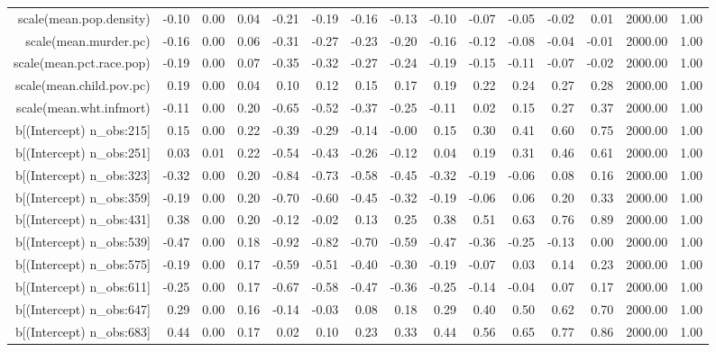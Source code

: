 \begin{table}[ht]
\begin{tabular}{rrrrrrrrrrrrrrr}
  scale(mean.pop.density) & -0.10 & 0.00 & 0.04 & -0.21 & -0.19 & -0.16 & -0.13 & -0.10 & -0.07 & -0.05 & -0.02 & 0.01 & 2000.00 & 1.00 \\ 
  scale(mean.murder.pc) & -0.16 & 0.00 & 0.06 & -0.31 & -0.27 & -0.23 & -0.20 & -0.16 & -0.12 & -0.08 & -0.04 & -0.01 & 2000.00 & 1.00 \\ 
  scale(mean.pct.race.pop) & -0.19 & 0.00 & 0.07 & -0.35 & -0.32 & -0.27 & -0.24 & -0.19 & -0.15 & -0.11 & -0.07 & -0.02 & 2000.00 & 1.00 \\ 
  scale(mean.child.pov.pc) & 0.19 & 0.00 & 0.04 & 0.10 & 0.12 & 0.15 & 0.17 & 0.19 & 0.22 & 0.24 & 0.27 & 0.28 & 2000.00 & 1.00 \\ 
  scale(mean.wht.infmort) & -0.11 & 0.00 & 0.20 & -0.65 & -0.52 & -0.37 & -0.25 & -0.11 & 0.02 & 0.15 & 0.27 & 0.37 & 2000.00 & 1.00 \\ 
  b[(Intercept) n\_obs:215] & 0.15 & 0.00 & 0.22 & -0.39 & -0.29 & -0.14 & -0.00 & 0.15 & 0.30 & 0.41 & 0.60 & 0.75 & 2000.00 & 1.00 \\ 
  b[(Intercept) n\_obs:251] & 0.03 & 0.01 & 0.22 & -0.54 & -0.43 & -0.26 & -0.12 & 0.04 & 0.19 & 0.31 & 0.46 & 0.61 & 2000.00 & 1.00 \\ 
  b[(Intercept) n\_obs:323] & -0.32 & 0.00 & 0.20 & -0.84 & -0.73 & -0.58 & -0.45 & -0.32 & -0.19 & -0.06 & 0.08 & 0.16 & 2000.00 & 1.00 \\ 
  b[(Intercept) n\_obs:359] & -0.19 & 0.00 & 0.20 & -0.70 & -0.60 & -0.45 & -0.32 & -0.19 & -0.06 & 0.06 & 0.20 & 0.33 & 2000.00 & 1.00 \\ 
  b[(Intercept) n\_obs:431] & 0.38 & 0.00 & 0.20 & -0.12 & -0.02 & 0.13 & 0.25 & 0.38 & 0.51 & 0.63 & 0.76 & 0.89 & 2000.00 & 1.00 \\ 
  b[(Intercept) n\_obs:539] & -0.47 & 0.00 & 0.18 & -0.92 & -0.82 & -0.70 & -0.59 & -0.47 & -0.36 & -0.25 & -0.13 & 0.00 & 2000.00 & 1.00 \\ 
  b[(Intercept) n\_obs:575] & -0.19 & 0.00 & 0.17 & -0.59 & -0.51 & -0.40 & -0.30 & -0.19 & -0.07 & 0.03 & 0.14 & 0.23 & 2000.00 & 1.00 \\ 
  b[(Intercept) n\_obs:611] & -0.25 & 0.00 & 0.17 & -0.67 & -0.58 & -0.47 & -0.36 & -0.25 & -0.14 & -0.04 & 0.07 & 0.17 & 2000.00 & 1.00 \\ 
  b[(Intercept) n\_obs:647] & 0.29 & 0.00 & 0.16 & -0.14 & -0.03 & 0.08 & 0.18 & 0.29 & 0.40 & 0.50 & 0.62 & 0.70 & 2000.00 & 1.00 \\ 
  b[(Intercept) n\_obs:683] & 0.44 & 0.00 & 0.17 & 0.02 & 0.10 & 0.23 & 0.33 & 0.44 & 0.56 & 0.65 & 0.77 & 0.86 & 2000.00 & 1.00 \\ 

\end{tabular}
\end{table}
